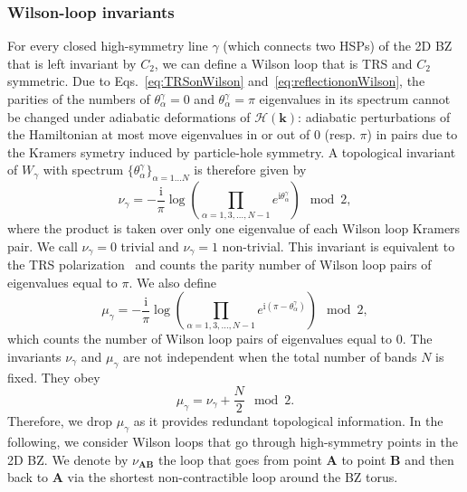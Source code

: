 \subsubsection*{Wilson-loop invariants} 
For every closed high-symmetry line $\gamma$ (which connects two HSPs) of the 2D BZ that is left invariant by $C_2$, we can define a Wilson loop that is TRS and $C_2$ symmetric. Due to Eqs.~\eqref{eq:TRSonWilson} and~\eqref{eq:reflectiononWilson}, the parities of the numbers of $\theta_\alpha^\gamma = 0$ and $\theta_\alpha^\gamma = \pi$ eigenvalues in its spectrum cannot be changed under adiabatic deformations of $\mathcal{H}(\mathbf{k})$: adiabatic perturbations of the Hamiltonian at most move eigenvalues in or out of $0$ (resp. $\pi$) in pairs due to the Kramers symetry induced by particle-hole symmetry. A topological invariant of $W_\gamma$ with spectrum $\{\theta_\alpha^\gamma\}_{\alpha = 1 \dots N}$ is therefore given by
\begin{equation}
\label{eq:wilsonloopwithreflectioninvariant}
\nu_{\gamma} = -\frac{\mathrm{i}}{\pi} \log \left( \prod_{\alpha=1,3,\dots,N-1} e^{\mathrm{i} \theta_\alpha^\gamma} \right) \mod 2,
\end{equation}
where the product is taken over only one eigenvalue of each Wilson loop Kramers pair. We call $\nu_{\gamma} = 0$ trivial and $\nu_{\gamma} = 1$ non-trivial. This invariant is equivalent to the TRS polarization~\cite{MirrorInsulatorOrtix} and counts the parity number of Wilson loop pairs of eigenvalues equal to $\pi$. We also define
\begin{equation}
\label{eq:wilsonloopwithreflectioninvariant2}
\mu_{\gamma} = -\frac{\mathrm{i}}{\pi} \log \left( \prod_{\alpha=1,3,\dots,N-1} e^{\mathrm{i} (\pi-\theta_\alpha^\gamma)} \right) \mod 2,
\end{equation}
which counts the number of Wilson loop pairs of eigenvalues equal to $0$. The invariants $\nu_{\gamma}$ and $\mu_{\gamma}$ are not independent when the total number of bands $N$ is fixed. They obey
\begin{equation}
\mu_{\gamma} = \nu_{\gamma} + \frac{N}{2} \mod 2.
\end{equation}
Therefore, we drop $\mu_\gamma$ as it provides redundant topological information. In the following, we consider Wilson loops that go through high-symmetry points in the 2D BZ. We denote by $\nu_{\mathbf{A B}}$ the loop that goes from point $\mathbf{A}$ to point $\mathbf{B}$ and then back to $\mathbf{A}$ via the shortest non-contractible loop around the BZ torus.

